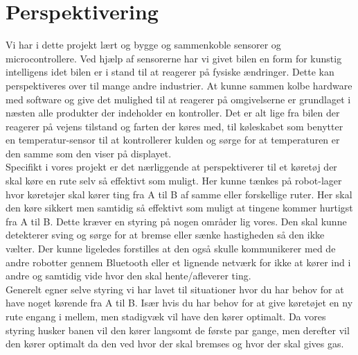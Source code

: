 \newpage
\section{Perspektivering}
\label{perspektivering}

Vi har i dette projekt lært og bygge og sammenkoble sensorer og microcontrollere. Ved hjælp af sensorerne har vi givet bilen en form for kunstig intelligens idet bilen er i stand til at reagerer på fysiske ændringer. Dette kan perspektiveres over til mange andre industrier. At kunne sammen kolbe hardware med software og give det mulighed til at reagerer på omgivelserne er grundlaget i næsten alle produkter der indeholder en kontroller. Det er alt lige fra bilen der reagerer på vejens tilstand og farten der køres med, til køleskabet som benytter en temperatur-sensor til at kontrollerer kulden og sørge for at temperaturen er den samme som den viser på displayet. \\

Specifikt i vores projekt er det nærliggende at perspektiverer til et køretøj der skal køre en rute selv så effektivt som muligt. Her kunne tænkes på robot-lager hvor køretøjer skal kører ting fra A til B af samme eller forskellige ruter. Her skal den køre sikkert men samtidig så effektivt som muligt at tingene kommer hurtigst fra A til B. Dette kræver en styring på nogen områder lig vores. Den skal kunne detekterer sving og sørge for at bremse eller sænke hastigheden så den ikke vælter. Der kunne ligeledes forstilles at den også skulle kommunikerer med de andre robotter gennem Bluetooth eller et lignende netværk for ikke at kører ind i andre og samtidig vide hvor den skal hente/afleverer ting. \\

Generelt egner selve styring vi har lavet til situationer hvor du har behov for at have noget kørende fra A til B. Især hvis du har behov for at give køretøjet en ny rute engang i mellem, men stadigvæk vil have den kører optimalt. Da vores styring husker banen vil den kører langsomt de første par gange, men derefter vil den kører optimalt da den ved hvor der skal bremses og hvor der skal gives gas. 
















